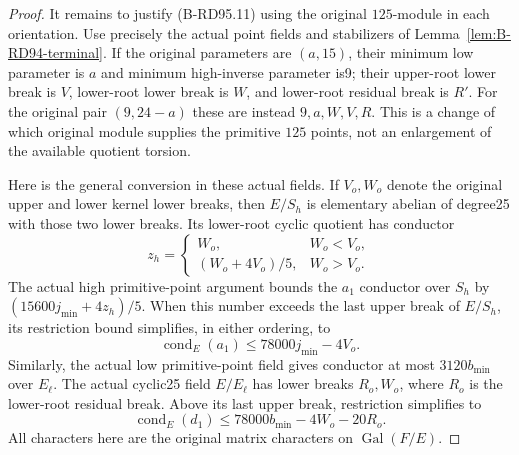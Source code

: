 \begin{proof}
It remains to justify (B-RD95.11) using the original $125$-module
in each orientation. Use precisely the actual point fields and
stabilizers of Lemma~\ref{lem:B-RD94-terminal}. If the original
parameters are $(a,15)$, their minimum low parameter is $a$ and
minimum high-inverse parameter is9; their upper-root lower break
is $V$, lower-root lower break is $W$, and lower-root residual
break is $R'$. For the original pair $(9,24-a)$ these are instead
$9,a,W,V,R$. This is a change of which original module supplies
the primitive $125$ points, not an enlargement of the available
quotient torsion.

Here is the general conversion in these actual fields. If
$V_o,W_o$ denote the original upper and lower kernel lower breaks,
then $E/S_h$ is elementary abelian of degree25 with those two
lower breaks. Its lower-root cyclic quotient has conductor
\[
 z_h=\begin{cases}
 W_o,&W_o<V_o,\\
 (W_o+4V_o)/5,&W_o>V_o.
 \end{cases}                                         \tag{B-RD95.15}
\]
The actual high primitive-point argument bounds the $a_1$
conductor over $S_h$ by $(15600j_{\min}+4z_h)/5$. When this
number exceeds the last upper break of $E/S_h$, its restriction
bound simplifies, in either ordering, to
\[
                 \operatorname{cond}_E(a_1)
                          \le78000j_{\min}-4V_o.     \tag{B-RD95.16}
\]
Similarly, the actual low primitive-point field gives conductor
at most $3120b_{\min}$ over $E_\ell$. The actual cyclic25 field
$E/E_\ell$ has lower breaks $R_o,W_o$, where $R_o$ is the
lower-root residual break. Above its last upper break, restriction
simplifies to
\[
                 \operatorname{cond}_E(d_1)
                    \le78000b_{\min}-4W_o-20R_o.     \tag{B-RD95.17}
\]
All characters here are the original matrix characters on
$\operatorname{Gal}(F/E)$.


\end{proof}
